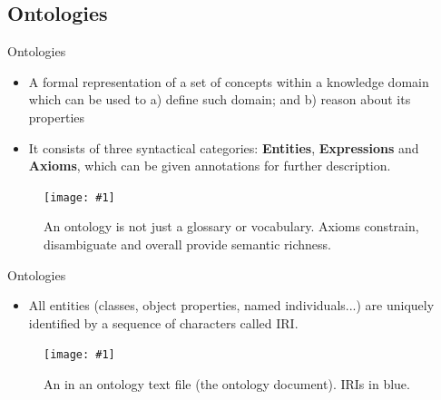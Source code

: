 \documentclass[english, xcolor=dvipsnames, aspectratio=169]{beamer}
\newcommand{\includefigurelarger}[2]
{
    \begin{figure}[h]
    \caption{#2}
    \centering
    \texttt{[image: \#1]}
    \end{figure}
}
\newcommand{\includefiguremedium}[2]
{
    \begin{figure}[h]
    \caption{#2}
    \centering
    \texttt{[image: \#1]}
    \end{figure}
}
\newcommand{\subsectiontitle}{}
\begin{document}
% 
\renewcommand{\subsectiontitle}{Ontologies}
\subsection{\subsectiontitle}
\begin{frame}{\subsectiontitle}
 			\begin{itemize}
\item A formal representation of a set of concepts within a knowledge domain which can be used to a) define such domain; and b) reason about its properties \cite{krotzsch_description_2013}  
\item It consists of three syntactical categories: \textbf{Entities}, \textbf{Expressions} and \textbf{Axioms}, which can be given annotations for further description. \cite{noauthor_owl_nodate}
    		\end{itemize}

                \includefiguremedium{ontologies4}{An ontology is not just a glossary or vocabulary. Axioms constrain, disambiguate and overall provide semantic richness.}

\end{frame}




% 


\begin{frame}{\subsectiontitle}
\begin{itemize}
\item All entities (classes, object properties, named individuals...) are uniquely identified by a sequence of characters called IRI.

\end{itemize}

 \includefigurelarger{class.pdf}{An  in an ontology text file (the ontology document). IRIs in blue.}
\end{frame}

%
\end{document}
